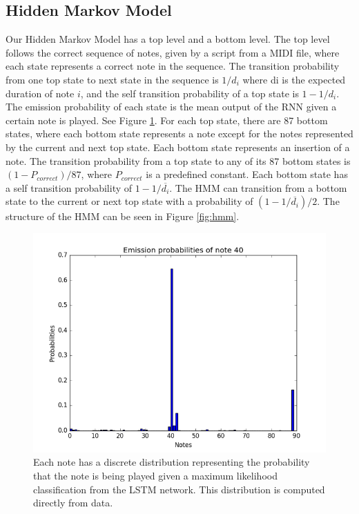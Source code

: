 \documentclass[twocolumn]{article}
\begin{document}
\subsection{Hidden Markov Model}

Our Hidden Markov Model has a top level and a bottom level. The top level follows the correct sequence of notes, given by a script from a MIDI file, where each state represents a correct note in the sequence. The transition probability from one top state to next state in the sequence is $1/d_i$ where di is the expected duration of note $i$, and the self transition probability of a top state is $1 - 1/d_i$. The emission probability of each state is the mean output of the RNN given a certain note is played. See Figure \ref{fig:distribution}. For each top state, there are 87 bottom states, where each bottom state represents a note except for the notes represented by the current and next top state. Each bottom state represents an insertion of a note. The transition probability from a top state to any of its 87 bottom states is $(1 - P_{correct})/87$, where $P_{correct}$ is a predefined constant. Each bottom state has a self transition probability of \(1 - 1/\overline{d_i}\). The HMM can transition from a bottom state to the current or next top state with a probability of $(1 - 1/\overline{d_i})/2$. The structure of the HMM can be seen in Figure \ref{fig:hmm}.

\begin{figure}
  \includegraphics[width=\textwidth]{figures/distribution.png}
  \caption{Each note has a discrete distribution representing the probability that the note is being played given a maximum likelihood classification from the LSTM network. This distribution is computed directly from data.}
  \label{fig:distribution}
\end{figure}
\end{document}
